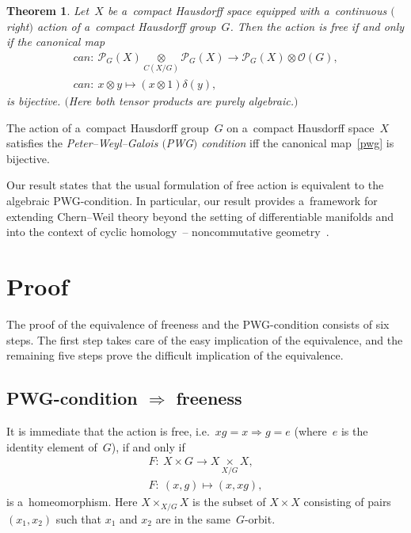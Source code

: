 \documentclass[11pt]{article}
\newtheorem{theorem}{Theorem}
\begin{document}
\begin{theorem}\label{theoGal}
Let~$X$ be a~compact Hausdorff space equipped with a~continuous $($right$)$ action of a~compact Hausdorff group~$G$.
Then the action is free if and only if the canonical map
\begin{gather}
{can} \colon \ \mathcal{P}_G(X)\underset{C(X/G)}{\otimes} \mathcal{P}_G(X) \longrightarrow \mathcal{P}_G(X)\otimes
\mathcal{O}(G),
\nonumber
\\
{can}\colon \ x\otimes y \longmapsto (x\otimes 1)\delta(y),
\label{pwg}
\end{gather}
is bijective.
$($Here both tensor products are purely algebraic.$)$
\end{theorem}
\begin{definition}
The action of a~compact Hausdorf\/f group~$G$ on a~compact Hausdorf\/f space~$X$ satisf\/ies the \emph{Peter--Weyl--Galois
$($PWG$)$ condition} if\/f the canonical map~\eqref{pwg} is bijective.
\end{definition}
\noindent Our result states that the usual formulation of free action is equivalent to the algebraic PWG-condition.
In particular, our result provides a~framework for extending Chern--Weil theory beyond the setting of dif\/ferentiable
manifolds and into the context of cyclic homology~--
noncommutative geometry~\cite{bh04}.

\section{Proof}

The proof of the equivalence of freeness and the PWG-condition consists of six steps.
The f\/irst step takes care of the easy implication of the equivalence, and the remaining f\/ive steps prove the dif\/f\/icult
implication of the equivalence.

\subsection[PWG-condition $\Rightarrow$ freeness]{PWG-condition $\boldsymbol{\Rightarrow}$ freeness}

It is immediate that the action is free, i.e.\ $xg=x \Longrightarrow g=e$ (where~$e$ is the identity element of~$G$), if
and only if
\begin{gather*}
F\colon \  X
\times
G  \longrightarrow X\underset{X/G}{
\times
}X,
\\
F\colon \  (x,g)  \longmapsto (x,xg),
\end{gather*}
is a~homeomorphism.
Here $X
\times
_{X/G}X$ is the subset of $X
\times
X$ consisting of pairs $(x_1, x_2)$ such that $x_1$ and $x_2$ are in the same~$G$-orbit.
\end{document}
